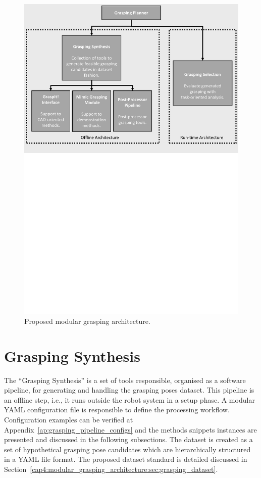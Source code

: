 \begin{figure}[h!]
\begin{tcolorbox}
\centerline{\includegraphics[trim={0cm 15cm 0cm 0cm},clip,width=0.95\linewidth,angle=0]{Cap4/Figuras/grasping_framework.pdf}}
\end{tcolorbox}
\caption{Proposed modular grasping architecture.}
\label{fig:grasping_framework_code}
\end{figure}

\section{Grasping Synthesis}
\label{cap4:modular_grasping_architecture:sec:grasping_synthesis}

The ``Grasping Synthesis'' is a set of tools responsible, organised as a software pipeline, for generating and handling the grasping poses dataset. This pipeline is an offline step, i.e., it runs outside the robot system in a setup phase. A modular YAML configuration file is responsible to define the processing workflow. Configuration examples can be verified at Appendix~\ref{ap:grasping_pipeline_configs} and the methods snippets instances are presented and discussed in the following subsections. The dataset is created as a set of hypothetical grasping pose candidates which are hierarchically structured in a YAML file format. The proposed dataset standard is detailed discussed in Section~\ref{cap4:modular_grasping_architecture:sec:grasping_dataset}.

